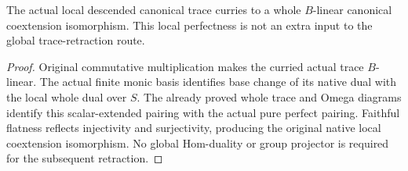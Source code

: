 \begin{corollary}
\label{cor:kn-nadel-canonical-mixed-perfectness}
\notready
The actual local descended canonical trace curries to a whole
$B$-linear canonical coextension isomorphism.  This local perfectness
is not an extra input to the global trace-retraction route.
\end{corollary}
\begin{proof}
Original commutative multiplication makes the curried actual trace
$B$-linear.  The actual finite monic basis identifies base change of
its native dual with the local whole dual over $S$.  The already proved
whole trace and Omega diagrams identify this scalar-extended pairing
with the actual pure perfect pairing.  Faithful flatness reflects
injectivity and surjectivity, producing the original native local
coextension isomorphism.  No global Hom-duality or group projector is
required for the subsequent retraction.
\end{proof}

